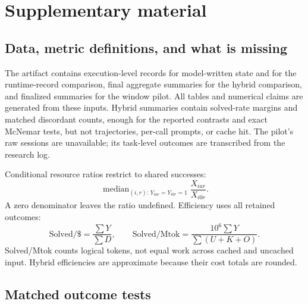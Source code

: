 \clearpage
\section*{Supplementary material}
\setcounter{subsection}{0}
\renewcommand{\thesubsection}{S\arabic{subsection}}
\renewcommand{\thetable}{S\arabic{table}}
\setcounter{table}{0}

\subsection{Data, metric definitions, and what is missing}
\label{app:reproducibility}
The artifact contains execution-level records for model-written state and
for the runtime-record comparison, final aggregate summaries for the
hybrid comparison, and finalized summaries for the window pilot. All
tables and numerical claims are generated from these inputs. Hybrid
summaries contain solved-rate margins and matched discordant counts, enough
for the reported contrasts and exact McNemar tests, but not trajectories,
per-call prompts, or cache hit. The pilot's raw sessions are unavailable;
its task-level outcomes are transcribed from the research log.

Conditional resource ratios restrict to shared successes:
\[
 \operatorname{median}_{(i,r):\,Y_{iar}=Y_{i0r}=1}
 \frac{X_{iar}}{X_{i0r}}.
\]
A zero denominator leaves the ratio undefined. Efficiency uses all
retained outcomes:
\[
 \text{Solved/\$}=\frac{\sum Y}{\sum D},
 \qquad
 \text{Solved/Mtok}=\frac{10^{6}\sum Y}{\sum(U+K+O)}.
\]
Solved/Mtok counts logical tokens, not equal work across cached and
uncached input. Hybrid efficiencies are approximate because their cost
totals are rounded.

\subsection{Matched outcome tests}
\label{app:contrasts}
\begin{table}[htbp]
\centering\small
\caption{Solved-rate differences in percentage points with exact McNemar
tests. Bootstrap intervals are available only for model-written memory.}
\label{tab:contrasts}

\end{table}

\begin{table}[htbp]
\centering\small
\caption{Solved-rate differences to full history within control-defined
horizon cohorts (model-written memory).}
\label{tab:horizon-contrasts}

\end{table}

